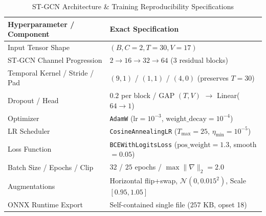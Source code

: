 \documentclass[conference]{IEEEtran}
\begin{document}
\begin{table}[htbp]
\caption{ST-GCN Architecture & Training Reproducibility Specifications}
\begin{center}
\begin{tabular}{ll}
\toprule
\textbf{Hyperparameter / Component} & \textbf{Exact Specification} \\
\midrule
Input Tensor Shape & $(B, C=2, T=30, V=17)$ \\
ST-GCN Channel Progression & $2 \rightarrow 16 \rightarrow 32 \rightarrow 64$ (3 residual blocks) \\
Temporal Kernel / Stride / Pad & $(9, 1)$ / $(1, 1)$ / $(4, 0)$ (preserves $T=30$) \\
Dropout / Head & $0.2$ per block / GAP $(T,V)$ $\to$ Linear($64 \to 1$) \\
Optimizer & \texttt{AdamW} ($\text{lr}=10^{-3}$, $\text{weight\_decay}=10^{-4}$) \\
LR Scheduler & \texttt{CosineAnnealingLR} ($T_{\max}=25$, $\eta_{\min}=10^{-5}$) \\
Loss Function & \texttt{BCEWithLogitsLoss} ($\text{pos\_weight}=1.3$, smooth $=0.05$) \\
Batch Size / Epochs / Clip & $32$ / $25$ epochs / $\max \|\nabla\|_2 = 2.0$ \\
Augmentations & Horizontal flip+swap, $\mathcal{N}(0, 0.015^2)$, Scale $[0.95, 1.05]$ \\
ONNX Runtime Export & Self-contained single file ($257\text{ KB}$, opset 18) \\
\bottomrule
\end{tabular}
\label{tab:train_hparams}
\end{center}
\end{table}
\end{document}
